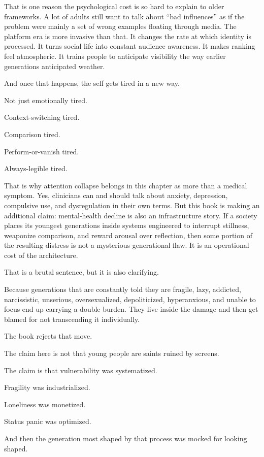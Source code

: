 \documentclass[
  american,
  12pt,
  letterpaper,
]{article}
\begin{document}
That is one reason the psychological cost is so hard to explain to older
frameworks. A lot of adults still want to talk about ``bad influences''
as if the problem were mainly a set of wrong examples floating through
media. The platform era is more invasive than that. It changes the rate
at which identity is processed. It turns social life into constant
audience awareness. It makes ranking feel atmospheric. It trains people
to anticipate visibility the way earlier generations anticipated
weather.

And once that happens, the self gets tired in a new way.

Not just emotionally tired.

Context-switching tired.

Comparison tired.

Perform-or-vanish tired.

Always-legible tired.

That is why attention collapse belongs in this chapter as more than a
medical symptom. Yes, clinicians can and should talk about anxiety,
depression, compulsive use, and dysregulation in their own terms. But
this book is making an additional claim: mental-health decline is also
an infrastructure story. If a society places its youngest generations
inside systems engineered to interrupt stillness, weaponize comparison,
and reward arousal over reflection, then some portion of the resulting
distress is not a mysterious generational flaw. It is an operational
cost of the architecture.

That is a brutal sentence, but it is also clarifying.

Because generations that are constantly told they are fragile, lazy,
addicted, narcissistic, unserious, oversexualized, depoliticized,
hyperanxious, and unable to focus end up carrying a double burden. They
live inside the damage and then get blamed for not transcending it
individually.

The book rejects that move.

The claim here is not that young people are saints ruined by screens.

The claim is that vulnerability was systematized.

Fragility was industrialized.

Loneliness was monetized.

Status panic was optimized.

And then the generation most shaped by that process was mocked for
looking shaped.
\end{document}
